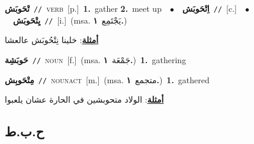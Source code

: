 \documentclass[10pt,a4paper,twoside]{article} %
\begin{document}
\begin{multicols}{2}
{\setlength\topsep{0pt}\textbf{\foreignlanguage{arabic}{تْحَوبَش}}\ {\color{gray}\texttt{//}\color{black}}\ \textsc{verb}\ [p.]\ \textbf{1.}~gather  \textbf{2.}~meet up\ \ $\bullet$\ \ \setlength\topsep{0pt}\textbf{\foreignlanguage{arabic}{اِتْحَوبَش}}\ {\color{gray}\texttt{//}\color{black}}\ [c.]\ \ $\bullet$\ \ \setlength\topsep{0pt}\textbf{\foreignlanguage{arabic}{يِتْحَوبَش}}\ {\color{gray}\texttt{//}\color{black}}\ [i.]\ \color{gray}(msa. \foreignlanguage{arabic}{يَجْتَمِع}~\foreignlanguage{arabic}{\textbf{١.}})\color{black}\  \begin{flushright}\color{gray}\foreignlanguage{arabic}{\textbf{\underline{\foreignlanguage{arabic}{أمثلة}}}: خلينا نِتْحُوبَش عالعشا}\end{flushright}\color{black}} \vspace{2mm}

{\setlength\topsep{0pt}\textbf{\foreignlanguage{arabic}{حَوبَشِة}}\ {\color{gray}\texttt{//}\color{black}}\ \textsc{noun}\ [f.]\ \color{gray}(msa. \foreignlanguage{arabic}{جَمْعَة}~\foreignlanguage{arabic}{\textbf{١.}})\color{black}\ \textbf{1.}~gathering\ } \vspace{2mm}

{\setlength\topsep{0pt}\textbf{\foreignlanguage{arabic}{مِتْحَوبِش}}\ {\color{gray}\texttt{//}\color{black}}\ \textsc{noun\textunderscore act}\ [m.]\ \color{gray}(msa. \foreignlanguage{arabic}{متجمع}~\foreignlanguage{arabic}{\textbf{١.}})\color{black}\ \textbf{1.}~gathered\  \begin{flushright}\color{gray}\foreignlanguage{arabic}{\textbf{\underline{\foreignlanguage{arabic}{أمثلة}}}: الولاد متحوبشين في الحارة عشان يلعبوا}\end{flushright}\color{black}} \vspace{2mm}

\vspace{-3mm}
\subsection*{\color{blue}\foreignlanguage{arabic}{ح.ب.ط}\color{blue}{}} 


\end{multicols}
\end{document}
